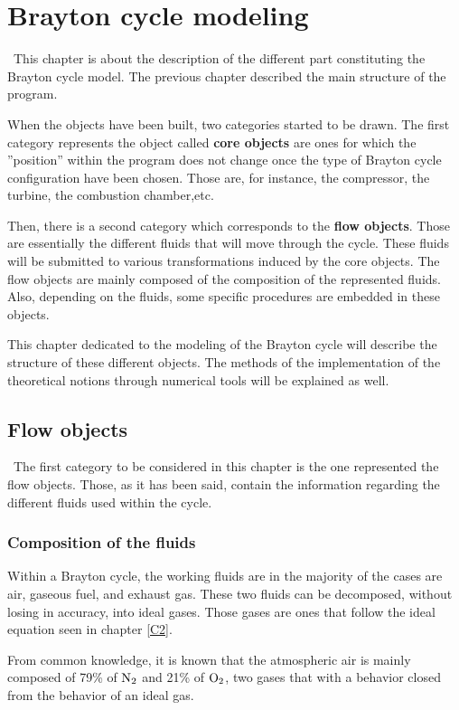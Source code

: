 \graphicspath{{Chapitre_7/Images/}}
\chapter{Brayton cycle modeling}\label{C7}
\quad\, This chapter is about the description of the different part constituting the Brayton cycle model. The previous chapter described the main structure of the program. 

When the objects have been built, two categories started to be drawn. The first category represents the object called \textbf{core objects} are ones for which the ''position'' within the program does not change once the type of Brayton cycle configuration have been chosen. Those are, for instance, the compressor, the turbine, the combustion chamber,etc.

Then, there is a second category which corresponds to the \textbf{flow objects}. Those are essentially the different fluids that will move through the cycle. These fluids will be submitted to various transformations induced by the core objects. The flow objects are mainly composed of the composition of the represented fluids. Also, depending on the fluids, some specific procedures are embedded in these objects.

This chapter dedicated to the modeling of the Brayton cycle will describe the structure of these different objects. The methods of the implementation of the theoretical notions through numerical tools will be explained as well.

\section{Flow objects}
\quad\ The first category to be considered in this chapter is the one represented the flow objects. Those, as it has been said, contain the information regarding the different fluids used within the cycle.

\subsection{Composition of the fluids}
Within a Brayton cycle, the working fluids are in the majority of the cases are air, gaseous fuel, and exhaust gas. These two fluids can be decomposed, without losing in accuracy, into ideal gases. Those gases are ones that follow the ideal equation seen in chapter \ref{C2}. 

From common knowledge, it is known that the atmospheric air is mainly composed of 79\% of $\ce{N2}$ and 21\% of $\ce{O2}$, two gases that with a behavior closed from the behavior of an ideal gas.

